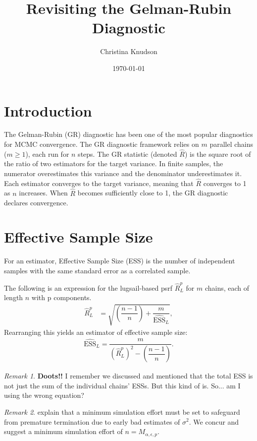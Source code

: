 \documentclass[12pt]{article}
\theoremstyle{remark}
\newtheorem{remark}{Remark}
\begin{document}
\title{Revisiting the Gelman-Rubin Diagnostic}
\date{\today}
\author{Christina Knudson}
\maketitle


\section{Introduction} %
\label{sec:introduction}

The Gelman-Rubin (GR) diagnostic has been one of the most popular diagnostics for MCMC convergence. The GR diagnostic framework relies on  $m$  parallel chains ($m \geq 1$), each run for $n$ steps. The GR statistic (denoted $\hat{R}$) is the square root of the ratio of two estimators for the target variance.  In finite samples, the numerator overestimates this variance and the denominator underestimates it. Each estimator converges to the target variance, meaning that $\hat{R}$ converges to 1 as $n$ increases. When $\hat{R}$ becomes sufficiently close to 1, the GR diagnostic declares convergence. 











\section{Effective Sample Size} %
\label{sec:choosing_delta}

For an estimator, Effective Sample Size (ESS) is the number of independent samples with the same standard error as a correlated sample. 

The following is an expression for the lugsail-based psrf $\hat{R}^p_L$ for $m$  chains, each of length $n$ with  p components.
\begin{align*}
	\hat{R}^p_L &= \sqrt{ \left(\dfrac{n-1}{n} \right) + \dfrac{m}{\widehat{\text{ESS}}_L}},
\end{align*}
Rearranging this yields an estimator of effective sample size:
\begin{align*}
\widehat{\text{ESS}}_L = \dfrac{m}{\left( \hat{R}^p_L \right)^2 -  \left(\dfrac{n-1}{n} \right)}.
\end{align*}

\begin{remark}
\textbf{Doots!!} I remember we discussed and mentioned that the total ESS is not just the sum of the individual chains' ESSs. But this kind of is. So... am I using the wrong equation?
\end{remark}
\begin{remark}
	\label{rem:minimum_effort}
\cite{vats:fleg:jones:2018} explain that a minimum simulation effort must be set to safeguard from premature termination due to early bad estimates of $\sigma^2$. We concur and  suggest  a minimum simulation effort of $n = M_{\alpha, \epsilon,p}$. \\
\end{remark}
\end{document}
